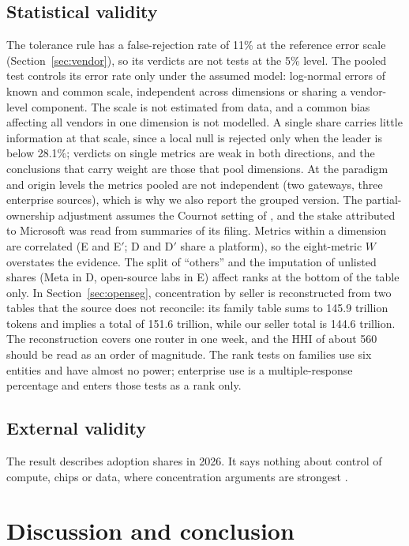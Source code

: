 \documentclass[11pt]{article}
\begin{document}
\subsection{Statistical validity} The tolerance rule has a false-rejection rate of 11\% at the reference error scale (Section~\ref{sec:vendor}), so its verdicts are not tests at the 5\% level. The pooled test controls its error rate only under the assumed model: log-normal errors of known and common scale, independent across dimensions or sharing a vendor-level component. The scale is not estimated from data, and a common bias affecting all vendors in one dimension is not modelled. A single share carries little information at that scale, since a local null is rejected only when the leader is below 28.1\%; verdicts on single metrics are weak in both directions, and the conclusions that carry weight are those that pool dimensions. At the paradigm and origin levels the metrics pooled are not independent (two gateways, three enterprise sources), which is why we also report the grouped version. The partial-ownership adjustment assumes the Cournot setting of \cite{obrien2000competitive}, and the stake attributed to Microsoft was read from summaries of its filing. Metrics within a dimension are correlated (E and E$'$; D and D$'$ share a platform), so the eight-metric $W$ overstates the evidence. The split of ``others'' and the imputation of unlisted shares (Meta in D, open-source labs in E) affect ranks at the bottom of the table only. In Section~\ref{sec:openseg}, concentration by seller is reconstructed from two tables that the source does not reconcile: its family table sums to 145.9 trillion tokens and implies a total of 151.6 trillion, while our seller total is 144.6 trillion. The reconstruction covers one router in one week, and the HHI of about 560 should be read as an order of magnitude. The rank tests on families use six entities and have almost no power; enterprise use is a multiple-response percentage and enters those tests as a rank only.

\subsection{External validity} The result describes adoption shares in 2026. It says nothing about control of compute, chips or data, where concentration arguments are strongest \cite{korinek2025concentrating}.

\section{Discussion and conclusion}
\end{document}
